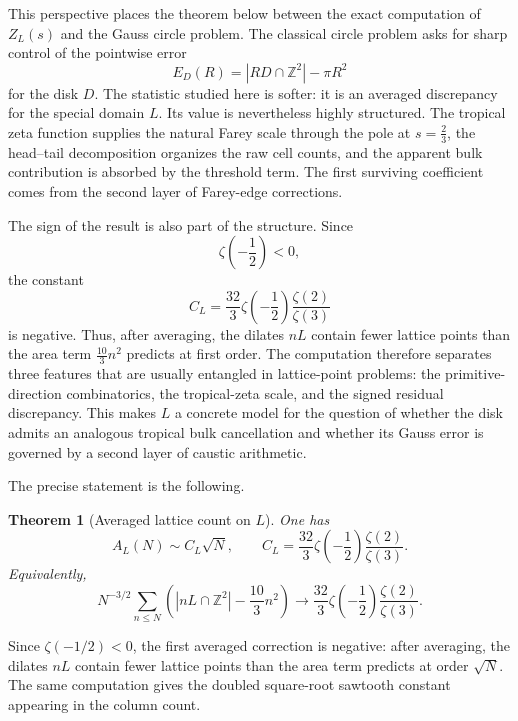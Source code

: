 \documentclass[a4paper,american,11pt]{amsart}
\theoremstyle{plain}
\newtheorem{theorem}{Theorem}[section]
\theoremstyle{definition}
\newcommand{\Z}{\mathbb Z}
\begin{document}
This perspective places the theorem below between the exact computation of
\(Z_L(s)\) and the Gauss circle problem. The classical circle problem asks for
sharp control of the pointwise error
\[
E_D(R)=|RD\cap\Z^2|-\pi R^2
\]
for the disk \(D\). The statistic studied here is softer: it is an averaged
discrepancy for the special domain \(L\). Its value is nevertheless highly
structured. The tropical zeta function supplies the natural Farey scale
through the pole at \(s=\frac23\), the head--tail decomposition organizes the
raw cell counts, and the apparent bulk contribution is absorbed by the
threshold term. The first surviving coefficient comes from the second layer
of Farey-edge corrections.

The sign of the result is also part of the structure. Since
\[
\zeta\!\left(-\frac12\right)<0,
\]
the constant
\[
C_L=\frac{32}{3}\zeta\!\left(-\frac12\right)\frac{\zeta(2)}{\zeta(3)}
\]
is negative. Thus, after averaging, the dilates \(nL\) contain fewer lattice
points than the area term \(\frac{10}{3}n^2\) predicts at first order. The
computation therefore separates three features that are usually entangled in
lattice-point problems: the primitive-direction combinatorics, the
tropical-zeta scale, and the signed residual discrepancy. This makes \(L\) a
concrete model for the question of whether the disk admits an analogous
tropical bulk cancellation and whether its Gauss error is governed by a
second layer of caustic arithmetic.

The precise statement is the following.

\begin{theorem}[Averaged lattice count on \(L\)]\label{thm:mainL}
One has
\begin{equation}\label{eq:mainCL}
A_L(N)\sim C_L\sqrt N,
\qquad
C_L=\frac{32}{3}\zeta\!\left(-\frac12\right)\frac{\zeta(2)}{\zeta(3)}.
\end{equation}
Equivalently,
\begin{equation}\label{eq:mainCLraw}
N^{-3/2}\sum_{n\le N}
\left(|nL\cap\Z^2|-\frac{10}{3}n^2\right)
\longrightarrow
\frac{32}{3}\zeta\!\left(-\frac12\right)\frac{\zeta(2)}{\zeta(3)}.
\end{equation}
\end{theorem}

Since \(\zeta(-1/2)<0\), the first averaged correction is negative: after
averaging, the dilates \(nL\) contain fewer lattice points than the area term
predicts at order \(\sqrt N\). The same computation gives the doubled
square-root sawtooth constant appearing in the column count.
\end{document}
